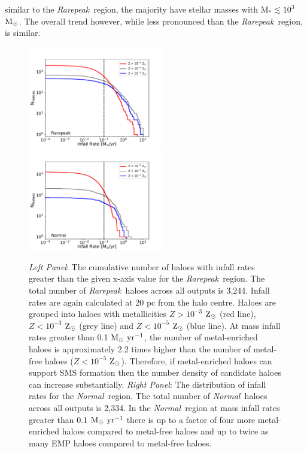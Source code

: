 \documentclass[twocolumn,iop,revtex4]{openjournal}
\newcommand{\msolarc} {$\rm{M_{\odot}}$}
\newcommand{\msolaryr} {$\rm{M_{\odot}~yr^{-1}}~$}
\newcommand{\msolaryrc} {$\rm{M_{\odot}~yr^{-1}}$}
\newcommand{\zsolar} {$\rm{Z_{\odot}}~$}
\newcommand{\zsolarc} {$\rm{Z_{\odot}}$}
\newcommand{\rarepeak} {\textit{Rarepeak~}}
\newcommand{\normal} {\textit{Normal~}}
\begin{document}
similar to the \rarepeak region, the majority have stellar masses
with M$_{*} \lesssim 10^3$ \msolarc. The overall trend however, while less pronounced than the \rarepeak region, is
similar. \\
\begin{figure}
\centering
\begin{minipage}{175mm}      \begin{center} 
\centerline{
\includegraphics[width=0.525\textwidth]{FIGURES/Rarepeak_NHaloes.pdf}
\includegraphics[width=0.525\textwidth]{FIGURES/Normal_NHaloes.pdf}}
\caption{\textit{Left Panel}: The cumulative number of haloes with infall rates greater than the given
  x-axis value for the \rarepeak region.  The total number of \rarepeak haloes across all outputs
  is 3,244. Infall rates are again calculated at 20 pc from the halo centre.
  Haloes are grouped into haloes with metallicities $Z> 10^{-3}$ \zsolar (red line),
  $Z< 10^{-3}$ \zsolar (grey line) and  $Z< 10^{-5}$ \zsolar (blue line). At mass infall
  rates greater than 0.1 \msolaryrc, the number of metal-enriched haloes is approximately 2.2 times
  higher than the number of 
  metal-free haloes ($Z< 10^{-5}$ \zsolarc). Therefore, if metal-enriched haloes can support SMS
  formation then the number density of candidate haloes can increase substantially. 
  \textit{Right Panel}: The distribution of
  infall rates for the \normal region. The  total number of \normal haloes across all outputs is 2,334.
  In the \normal region at mass infall
  rates greater than 0.1 \msolaryr there is up to a factor of four more metal-enriched haloes compared to
  metal-free haloes and up to twice as many EMP haloes compared to metal-free haloes. 
 } \label{Fig:Histogram}
\end{center} \end{minipage}

\end{figure}
\end{document}
